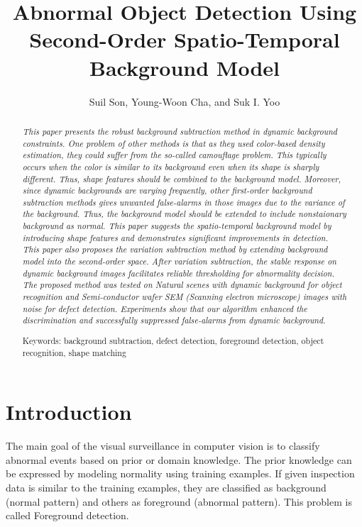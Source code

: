 \documentclass[a4paper,twocolumn, 10pt]{article}
\title{Abnormal Object Detection Using Second-Order Spatio-Temporal Background Model}
\author{Suil Son, Young-Woon Cha, and Suk I. Yoo}
\begin{document}
\maketitle

\begin{abstract}
\emph{
This paper presents the robust background subtraction method in dynamic background constraints. 
One problem of other methods is that as they used color-based density estimation, they could suffer from the so-called camouflage problem. This typically occurs when the color is similar to its background even when its shape is sharply different. Thus, shape features should be combined to the background model.
Moreover, since dynamic backgrounds are varying frequently, other first-order background subtraction methods gives unwanted false-alarms in those images due to the variance of the background. Thus, the background model should be extended to include nonstaionary background as normal. 
This paper suggests the spatio-temporal background model by introducing shape features and demonstrates significant improvements in detection. This paper also proposes the variation subtraction method by extending background model into the second-order space. After variation subtraction, the stable response on dynamic background images facilitates reliable thresholding for abnormality decision. 
The proposed method was tested on Natural scenes with dynamic background for object recognition and Semi-conductor wafer SEM (Scanning electron microscope) images with noise for defect detection. Experiments show that our algorithm enhanced the discrimination and successfully suppressed false-alarms from dynamic background.
}

Keywords:  background subtraction, defect detection, foreground detection, object recognition, shape matching

\end{abstract}


\section{Introduction}
The main goal of the visual surveillance in computer vision is to classify abnormal events based on prior or domain knowledge. The prior knowledge can be expressed by modeling normality using training examples. If given inspection data is similar to the training examples, they are classified as background (normal pattern) and others as foreground (abnormal pattern). This problem is called Foreground detection.
\end{document}
